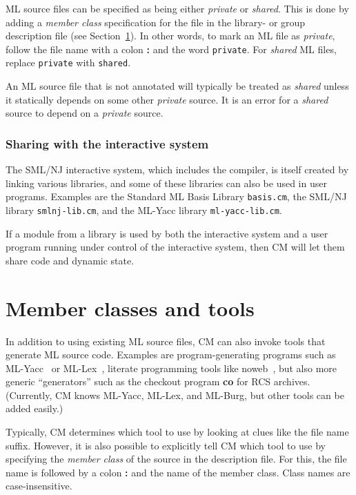 \documentclass{article}
\begin{document}
ML source files can be specified as being either {\em private} or {\em
shared}.  This is done by adding a {\em member class} specification
for the file in the library- or group description file (see
Section~\ref{sec:classes}).  In other words, to mark an ML file as
{\em private}, follow the file name with a colon {\bf :} and the word
{\tt private}.  For {\em shared} ML files, replace {\tt private} with
{\tt shared}.

An ML source file that is not annotated will typically be treated as
{\em shared} unless it statically depends on some other {\em private}
source.  It is an error for a {\em shared} source to depend on a {\em
private} source.

\subsubsection*{Sharing with the interactive system}

The SML/NJ interactive system, which includes the compiler, is itself
created by linking various libraries, and some of these libraries can
also be used in user programs.  Examples are the Standard ML Basis
Library {\tt basis.cm}, the SML/NJ library {\tt smlnj-lib.cm}, and the
ML-Yacc library {\tt ml-yacc-lib.cm}.

If a module from a library is used by both the interactive system and
a user program running under control of the interactive system, then
CM will let them share code and dynamic state.

\section{Member classes and tools}
\label{sec:classes}

In addition to using existing ML source files, CM can also invoke
tools that generate ML source code.  Examples are
program-generating programs such as ML-Yacc~\cite{tarditi90:yacc} or
ML-Lex~\cite{appel89:lex}, literate programming tools like
noweb~\cite{ramsey:simplified}, but also more generic ``generators''
such as the checkout program {\bf co} for RCS archives.
(Currently, CM knows ML-Yacc, ML-Lex, and ML-Burg, but other tools can
be added easily.)

Typically, CM determines which tool to use by looking at clues like
the file name suffix.  However, it is also possible to explicitly tell
CM which tool to use by specifying the {\em member class} of the
source in the description file.  For this, the file name is followed
by a colon {\bf :} and the name of the member class.  Class names are
case-insensitive.
\end{document}
